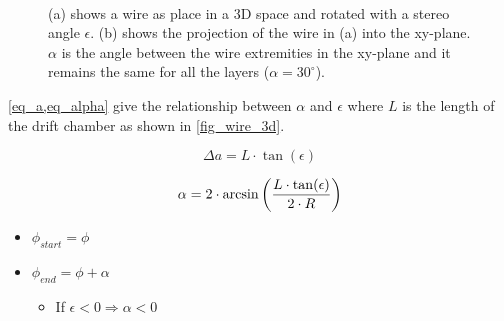\begin{figure}[ht]
\begin{subfigure}[b]{0.49\textwidth}
     \caption{}
     \label{fig_wire_2d}
  \end{subfigure}~
	\caption{(a) shows a wire as place in a 3D space and rotated with a stereo angle $\epsilon$. (b) shows the projection of the wire in (a) into the xy-plane. $\alpha$ is the angle between the wire extremities in the xy-plane and it remains the same for all the layers ($\alpha = 30^{\circ}$).}
	\label{wires_dch}
\end{figure}

\cref{eq_a,eq_alpha} give the relationship between $\alpha$ and $\epsilon$ where $L$ is the length of the drift chamber as shown in \cref{fig_wire_3d}.



\begin{equation}
  \Delta a = L \cdot \tan(\epsilon)
  \label{eq_a}
\end{equation}


\begin{equation}
  \alpha = 2 \cdot \arcsin\left({{L \cdot \tan(\epsilon)} \over {2
        \cdot R}}\right)
    \label{eq_alpha}
\end{equation}


\begin{itemize}
\item $\phi_{start}=\phi$
\item $\phi_{end}=\phi+\alpha$
  \begin{itemize}
  \item If $\epsilon<0 \Rightarrow \alpha<0$
  \end{itemize}
\end{itemize}

